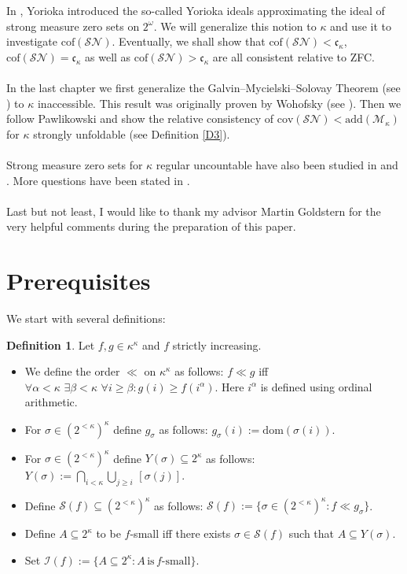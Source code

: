 \documentclass[12pt,a4paper]{scrartcl}
\theoremstyle{definition}
\newtheorem{definition}{Definition}[section]
\numberwithin{equation}{section}
\begin{document}
In \cite{Yorioka}, Yorioka introduced the so-called Yorioka ideals approximating the ideal of strong measure zero sets on $2^\omega$. We will generalize this notion to $\kappa$ and use it to investigate $\text{cof}(\mathcal{SN})$. Eventually, we shall show that $\text{cof}(\mathcal{SN}) < \mathfrak{c}_\kappa$, $\text{cof}(\mathcal{SN}) = \mathfrak{c}_\kappa$ as well as $\text{cof}(\mathcal{SN}) > \mathfrak{c}_\kappa$ are all consistent relative to ZFC.\\
\\
In the last chapter we first generalize the Galvin–Mycielski–Solovay Theorem (see \cite{Judah}) to $\kappa$ inaccessible. This result was originally proven by Wohofsky (see \cite{Wohofsky}). Then we follow Pawlikowski \cite{Pawlikowski} and show the relative consistency of $\text{cov}(\mathcal{SN}) < \text{add}(\mathcal{M}_\kappa)$ for $\kappa$ strongly unfoldable (see Definition \ref{D3}).\\
\\
Strong measure zero sets for $\kappa$ regular uncountable have also been studied in \cite{Halko} and \cite{Halko2}. More questions have been stated in \cite{Questions}.\\
\\
Last but not least, I would like to thank my advisor Martin Goldstern for the very helpful comments during the preparation of this paper.

\section{Prerequisites}

We start with several definitions:

\begin{definition}
Let $f,g \in \kappa^\kappa$ and $f$ strictly increasing.
\begin{itemize}
\item We define the order $\ll$ on $\kappa^\kappa$ as follows:
$f\ll g$ iff $\forall \alpha < \kappa \, \, \exists \beta < \kappa \, \, \forall i \geq \beta \colon g(i) \geq f(i^\alpha)$. Here $i^\alpha$ is defined using ordinal arithmetic.
\item For $\sigma \in (2^{<\kappa})^\kappa$ define $g_\sigma$ as follows: $g_\sigma (i):= \text{dom}(\sigma(i))$.
\item For $\sigma \in (2^{<\kappa})^\kappa$ define $Y(\sigma) \subseteq 2^\kappa$ as follows: $Y(\sigma):= \bigcap_{i < \kappa} \bigcup_{j \geq i} \, [\sigma(j)]$.
\item Define $\mathcal{S}(f) \subseteq (2^{<\kappa})^\kappa$ as follows: $\mathcal{S}(f):=\{ \sigma \in (2^{<\kappa})^\kappa \colon f \ll g_\sigma\}$.
\item Define $A \subseteq 2^\kappa$ to be $f$-small iff there exists $\sigma \in \mathcal{S}(f)$ such that $A \subseteq Y(\sigma)$.
\item Set $\mathcal{I}(f):=\{A \subseteq 2^\kappa \colon A \, \text{is} \,  f\text{-small} \}$.
\end{itemize}
\end{definition}
\end{document}
